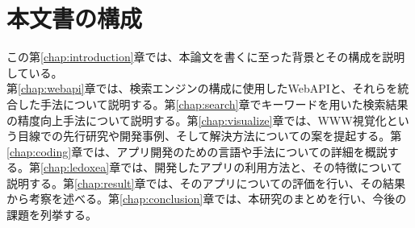 \section{本文書の構成}
この第\ref{chap:introduction}章では、本論文を書くに至った背景とその構成を説明している。\\
第\ref{chap:webapi}章では、検索エンジンの構成に使用したWebAPIと、それらを統合した手法について説明する。第\ref{chap:search}章でキーワードを用いた検索結果の精度向上手法について説明する。第\ref{chap:visualize}章では、WWW視覚化という目線での先行研究や開発事例、そして解決方法についての案を提起する。第\ref{chap:coding}章では、アプリ開発のための言語や手法についての詳細を概説する。第\ref{chap:ledoxea}章では、開発したアプリの利用方法と、その特徴について説明する。第\ref{chap:result}章では、そのアプリについての評価を行い、その結果から考察を述べる。第\ref{chap:conclusion}章では、本研究のまとめを行い、今後の課題を列挙する。